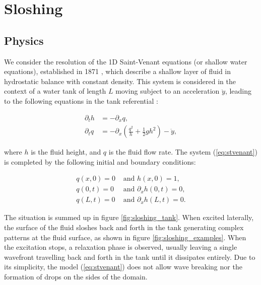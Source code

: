 \chapter{Sloshing}

\section{Physics}

We consider the resolution of the 1D Saint-Venant equations (or shallow water equations), established in 1871 \cite{saintvenant1871}, which describe a shallow layer of fluid in hydrostatic balance with constant density. This system is considered in the context of a water tank of length $L$ moving subject to an acceleration $\ddot{y}$, leading to the following equations in the tank referential \cite{berger2022}:

\begin{equation}
\label{eq:stvenant}
\begin{split}
	\partial_t h 	&= -\partial_x q, \\
	\partial_t q		&= -\partial_x \left( \frac{q^2}{h} + \frac{1}{2} g h^2 \right) - \ddot{y},
\end{split}
\end{equation}

where $h$ is the fluid height, and $q$ is the fluid flow rate. The system (\ref{eq:stvenant}) is completed by the following initial and boundary conditions:

\begin{equation}
\label{eq:stvenant_bc}
\begin{split}
	q(x,0)	= 0 &\text{ and } h(x,0)	= 1, \\
	q(0,t) 	= 0 &\text{ and } \partial_x h(0,t) = 0, \\
	q(L,t) 	= 0 &\text{ and } \partial_x h(L,t) = 0.
\end{split}
\end{equation}

The situation is summed up in figure \ref{fig:sloshing_tank}. When excited laterally, the surface of the fluid sloshes back and forth in the tank generating complex patterns at the fluid surface, as shown in figure \ref{fig:sloshing_examples}. When the excitation stops, a relaxation phase is observed, usually leaving a single wavefront travelling back and forth in the tank until it dissipates entirely. Due to its simplicity, the model (\ref{eq:stvenant}) does not allow wave breaking nor the formation of drops on the sides of the domain.

